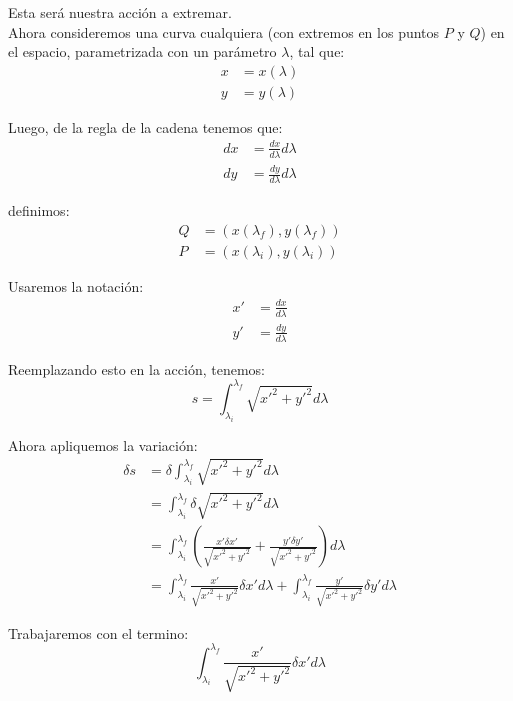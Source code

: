 \documentclass[12pt]{report}
\begin{document}
Esta ser\'a nuestra acci\'on a extremar. \\

Ahora consideremos una curva cualquiera (con extremos en los puntos $P$ y $Q$) en el espacio, parametrizada con un parámetro 
$\lambda$, tal que:
	\begin{align*}
		x &= x \left( \lambda \right) \\
		y &= y \left( \lambda \right)
	\end{align*}

Luego, de la regla de la cadena tenemos que:
	\begin{align*}
		dx &= \frac{dx}{d\lambda} d\lambda \\
		dy &= \frac{dy}{d\lambda} d\lambda
	\end{align*}
	
definimos:
	\begin{align*}
		Q &= \left( x \left(\lambda_{f} \right) , y \left(\lambda_{f} \right) \right) \\
		P &= \left( x \left(\lambda_{i} \right) , y \left(\lambda_{i} \right) \right)
	\end{align*}
	
Usaremos la notaci\'on:
	\begin{align*}
		x' &= \frac{dx}{d\lambda} \\
		y' &= \frac{dy}{d\lambda}
	\end{align*}

Reemplazando esto en la acci\'on, tenemos:
	\begin{equation*}
		s = \int^{\lambda_{f}}_{\lambda_{i}} \sqrt{x'^{2} + y'^{2}}d\lambda
	\end{equation*}	
		
Ahora apliquemos la variaci\'on:
	\begin{align*}
		\delta s &= \delta \int^{\lambda_{f}}_{\lambda_{i}}  \sqrt{ x'^{2} + y'^{2} }d\lambda \\
				 &= \int^{\lambda_{f}}_{\lambda_{i}}  \delta \sqrt{ x'^{2} + y'^{2} }d\lambda \\
				 &= \int^{\lambda_{f}}_{\lambda_{i}}  \left( \frac{x' \delta x'}{\sqrt{ x'^{2} + y'^{2} }} + \frac{y' \delta y'}{\sqrt{ x'^{2} + y'^{2} }} \right) d\lambda \\
				 &= \int^{\lambda_{f}}_{\lambda_{i}}  \frac{x'}{\sqrt{ x'^{2} + y'^{2} }} \delta x' d\lambda 
				  + \int^{\lambda_{f}}_{\lambda_{i}}  \frac{y'}{\sqrt{ x'^{2} + y'^{2} }} \delta y' d\lambda
	\end{align*}

Trabajaremos con el termino:
	\begin{equation*}
		\int^{\lambda_{f}}_{\lambda_{i}}  \frac{x'}{\sqrt{ x'^{2} + y'^{2} }} \delta x' d\lambda  
	\end{equation*}
\end{document}
